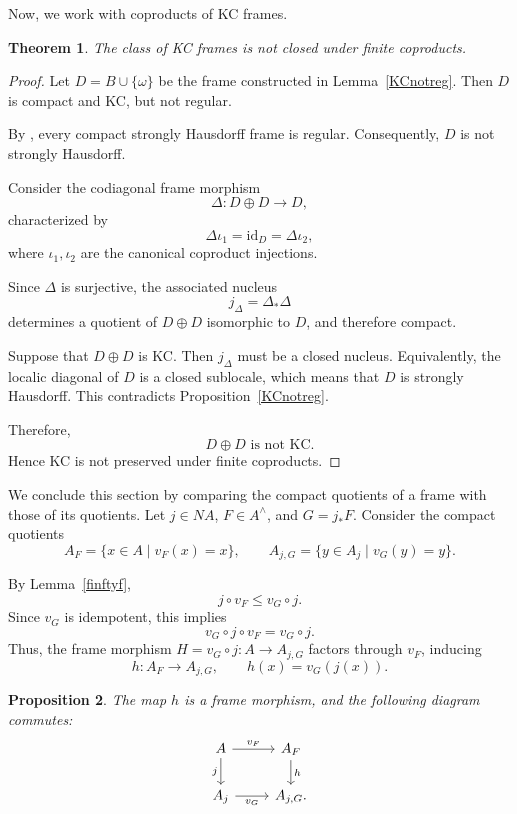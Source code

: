 \documentclass[11pt]{amsart}
\theoremstyle{plain}
\newtheorem{thm}{Theorem}[section]
\newtheorem{prop}[thm]{Proposition}
\theoremstyle{definition}
\begin{document}
Now, we work with coproducts of KC frames.

\begin{thm}\label{oplusKC}
The class of KC frames is not closed under
finite coproducts.
\end{thm}

\begin{proof}
Let $D=B\cup\{\omega\}$ be the frame constructed
in Lemma~\ref{KCnotreg}. Then $D$ is
compact and KC, but not regular.

By \cite[Theorem III 9.1.1]{picado2021separation},
every compact strongly Hausdorff frame is
regular. Consequently, $D$ is not strongly
Hausdorff.

Consider the codiagonal frame morphism
\[
\Delta:D\oplus D\longrightarrow D,
\]
characterized by
\[
\Delta\iota_1=\mathrm{id}_D=\Delta\iota_2,
\]
where $\iota_1,\iota_2$ are the canonical
coproduct injections.

Since $\Delta$ is surjective, the associated
nucleus
\[
j_\Delta=\Delta_*\Delta
\]
determines a quotient of $D\oplus D$
isomorphic to $D$, and therefore compact.

Suppose that $D\oplus D$ is KC. Then
$j_\Delta$ must be a closed nucleus.
Equivalently, the localic diagonal of $D$
is a closed sublocale, which means that
$D$ is strongly Hausdorff. This contradicts
Proposition~\ref{KCnotreg}.

Therefore,
\[
D\oplus D\text{ is not KC}.
\]
Hence KC is not preserved under finite
coproducts.
\end{proof}

We conclude this section by comparing the
compact quotients of a frame with those of
its quotients. Let $j\in NA$,
$F\in A^\wedge$, and $G=j_*F$.
Consider the compact quotients
\[
A_F=\{x\in A\mid v_F(x)=x\},
\qquad
A_{j,G}=\{y\in A_j\mid v_G(y)=y\}.
\]

By Lemma~\ref{finftyf},
\[
j\circ v_F\leq v_G\circ j.
\]
Since $v_G$ is idempotent, this implies
\[
v_G\circ j\circ v_F=v_G\circ j.
\]
Thus, the frame morphism
$H=v_G\circ j:A\to A_{j,G}$
factors through $v_F$, inducing
\[
h:A_F\longrightarrow A_{j,G},
\qquad h(x)=v_G(j(x)).
\]

\begin{prop}\label{VFsquare}
The map $h$ is a frame morphism, and the
following diagram commutes:
\begin{equation}\label{Cuadrado}
\begin{tikzcd}
A \arrow[r,"v_F"] \arrow[d,"j"']
  & A_F \arrow[d,"h"]\\
A_j \arrow[r,"v_G"']
  & A_{j,G}.
\end{tikzcd}
\end{equation}
\end{prop}
\end{document}
